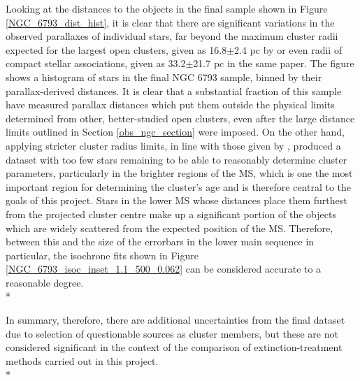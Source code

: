 \documentclass[12pt, a4paper]{report}
\begin{document}
Looking at the distances to the objects in the final sample shown in Figure \ref{NGC_6793_dist_hist}, it is clear that there are significant variations in the observed parallaxes of individual stars, far beyond the maximum cluster radii expected for the largest open clusters, given as 16.8$\pm$2.4 pc by \cite{2006A&A...456..523S} or even radii of compact stellar associations, given as 33.2$\pm$21.7 pc in the same paper. The figure shows a histogram of stars in the final NGC 6793 sample, binned by their parallax-derived distances. It is clear that a substantial fraction of this sample have measured parallax distances which put them outside the physical limits determined from other, better-studied open clusters, even after the large distance limits outlined in Section \ref{obs_ngc_section} were imposed. On the other hand, applying stricter cluster radius limits, in line with those given by \cite{2006A&A...456..523S}, produced a dataset with too few stars remaining to be able to reasonably determine cluster parameters, particularly in the brighter regions of the MS, which is one the most important region for determining the cluster's age and is therefore central to the goals of this project. Stars in the lower MS whose distances place them furthest from the projected cluster centre make up a significant portion of the objects which are widely scattered from the expected position of the MS. Therefore, between this and the size of the errorbars in the lower main sequence in particular, the isochrone fits shown in Figure \ref{NGC_6793_isoc_inset_1.1_500_0.062} can be considered accurate to a reasonable degree. \\*

In summary, therefore, there are additional uncertainties from the final dataset due to selection of questionable sources as cluster members, but these are not considered significant in the context of the comparison of extinction-treatment methods carried out in this project. \\*
\end{document}
